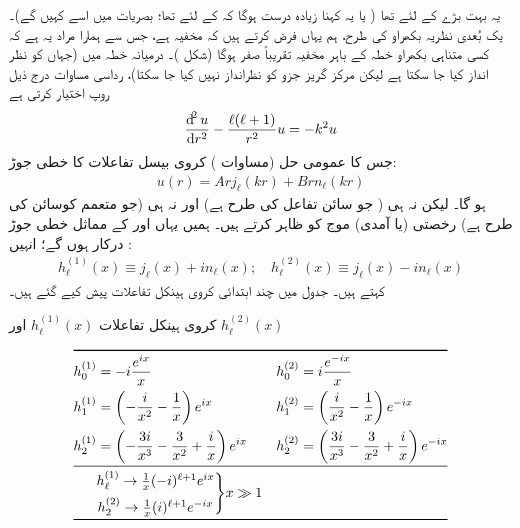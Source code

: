 یہ بہت بڑے   کے لئے تھا ( یا یہ کہنا زیادہ درست ہوگا کہ  کے لئے تھا؛    بصریات میں اسے    کہیں گے)۔ یک بُعدی نظریہ بکھراو کی طرح،  ہم یہاں فرض کرتے ہیں کہ مخفیہ   ہے،  جس سے  ہمارا مراد یہ ہے کہ کسی متناہی بکھراو خطہ کے باہر  مخفیہ  تقریباً صفر ہوگا  (شکل )۔ درمیانہ  خطہ میں (جہاں  کو  نظر انداز  کیا جا سکتا ہے لیکن مرکز گریز جزو کو نظرانداز نہیں کیا جا سکتا)،   رداسی مساوات درج ذیل روپ اختیار کرتی ہے
\begin{align}
	\frac{\dif^2u}{\dif r^2}-\frac{\ell(\ell+1)}{r^2}u = -k^2u
\end{align}
جس کا عمومی حل (مساوات )   کروی بیسل تفاعلات کا خطی جوڑ:
\begin{align}
	u(r) = Arj_{\ell}(kr)+Brn_{\ell}(kr)
\end{align}
ہو گا۔ لیکن نہ ہی  ( جو سائن تفاعل کی طرح ہے)  اور نہ ہی  (جو متعمم کوسائن کی طرح ہے)   رخصتی (یا آمدی) موج کو ظاہر  کرتے ہیں۔ ہمیں یہاں  اور   کے مماثل   خطی جوڑ درکار ہوں گے؛  انہیں :
\begin{align}\label{مساوات_بکھراو_کروی_ہینکل}
	h^{(1)}_{\ell}(x)\equiv j_{\ell}(x)+in_{\ell}(x);\quad h^{(2)}_{\ell}(x)\equiv j_{\ell}(x)-in_{\ell}(x)
\end{align}
  کہتے ہیں۔ جدول    میں چند ابتدائی کروی ہینکل تفاعلات پیش کیے  گئے ہیں۔
\begin{table}[h!]
\centering
\caption{کروی ہینکل تفاعلات $h_{\ell}^{(1)}(x)$ اور $h_{\ell}^{(2)}(x)$}
\label{جدول_بکھراو_ہینکل_تفاعلات}
\begin{align*}
\toprule
h_0^{(1)}& = -i\frac{e^{ix}}{x} & & h_0^{(2)} = i\frac{e^{-ix}}{x} \\
h_1^{(1)} &= \left(-\frac{i}{x^2}-\frac{1}{x}\right)e^{ix} & & h_1^{(2)} = \left(\frac{i}{x^2}-\frac{1}{x}\right)e^{-ix} \\
h_2^{(1)} &= \left(-\frac{3i}{x^3}-\frac{3}{x^2}+\frac{i}{x}\right)e^{ix} & & h_2^{(2)} = \left(\frac{3i}{x^3}-\frac{3}{x^2}+\frac{i}{x}\right)e^{-ix}\\
\midrule
&\begin{matrix}
 	h_{\ell}^{(1)}\rightarrow\frac{1}{x}(-i)^{\ell+1}e^{ix} \\[0.5em]
 	h_2^{(2)}\rightarrow\frac{1}{x}(i)^{\ell+1}e^{-ix}
 \end{matrix}
	\Bigg\}x \gg 1\\
\bottomrule
\end{align*}
\end{table}
